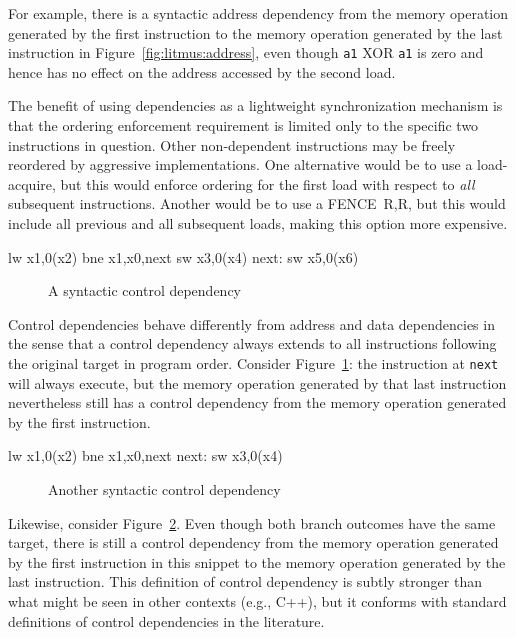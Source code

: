 For example, there is a syntactic address
dependency from the memory operation generated by the first instruction to the memory operation generated by the last instruction in
Figure~\ref{fig:litmus:address}, even though {\tt a1} XOR {\tt a1} is zero and
hence has no effect on the address accessed by the second load.

The benefit of using dependencies as a lightweight synchronization mechanism is that the ordering enforcement requirement is limited only to the specific two instructions in question.
Other non-dependent instructions may be freely reordered by aggressive implementations.
One alternative would be to use a load-acquire, but this would enforce ordering for the first load with respect to {\em all} subsequent instructions.
Another would be to use a FENCE~R,R, but this would include all previous and all subsequent loads, making this option more expensive.

\begin{verbbox}
      lw  x1,0(x2)
      bne x1,x0,next
      sw  x3,0(x4)
next: sw  x5,0(x6)
\end{verbbox}
\begin{figure}[h!]
  \centering\small
  \theverbbox
  \caption{A syntactic control dependency}
  \label{fig:litmus:control1}
\end{figure}

Control dependencies behave differently from address and data dependencies in the sense that a control dependency always extends to all instructions following the original target in program order.
Consider Figure~\ref{fig:litmus:control1}: the instruction at {\tt next} will always execute, but the memory operation generated by that last instruction nevertheless still has a control dependency from the memory operation generated by the first instruction.

\begin{verbbox}
        lw  x1,0(x2)
        bne x1,x0,next
  next: sw  x3,0(x4)
\end{verbbox}
\begin{figure}[h!]
  \centering\small
  \theverbbox
  \caption{Another syntactic control dependency}
  \label{fig:litmus:control2}
\end{figure}

Likewise, consider Figure~\ref{fig:litmus:control2}.
Even though both branch outcomes have the same target, there is still a control dependency from the memory operation generated by the first instruction in this snippet to the memory operation generated by the last instruction.
This definition of control dependency is subtly stronger than what might be seen in other contexts (e.g., C++), but it conforms with standard definitions of control dependencies in the literature.

